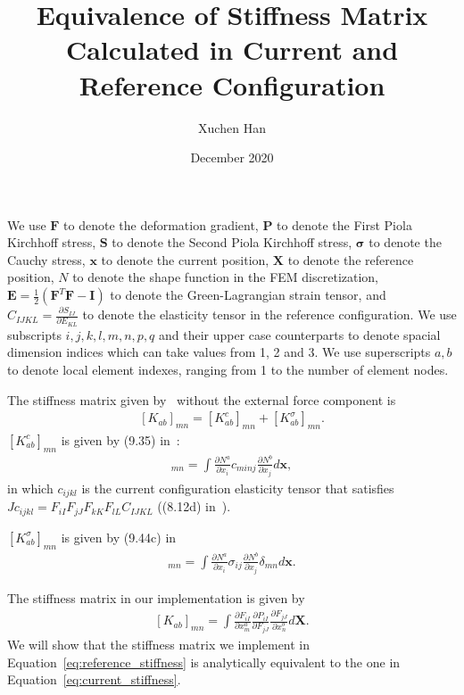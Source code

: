 \documentclass[a4paper]{article}
\title{Equivalence of Stiffness Matrix Calculated in Current and Reference
Configuration}
\author{Xuchen Han}
\date{December 2020}
\newcommand{\mb}[1]{{\mathbf{#1}}}
\newcommand{\EE}{\mb{E}}
\newcommand{\FF}{\mb{F}}
\newcommand{\II}{\mb{I}}
\newcommand{\PP}{\mb{P}}
\renewcommand{\SS}{\mb{S}}
\newcommand{\XX}{\mb{X}}
\newcommand{\xx}{\mb{x}}
\newcommand{\ssigma}{\boldsymbol{\sigma}}
\begin{document}
    \maketitle

    We use $\FF$ to denote the deformation gradient, $\PP$ to denote the
    First Piola
    Kirchhoff stress, $\SS$ to denote the Second Piola Kirchhoff stress,
    $\ssigma$
    to denote the Cauchy stress, $\xx$ to denote the current position, $\XX$
    to denote the reference position, $N$ to denote the shape function in the
    FEM discretization, $\EE = \frac{1}{2}(\FF^T \FF - \II)$ to denote the
    Green-Lagrangian strain tensor, and $C_{IJKL} = \frac{\partial
        S_{IJ}}{\partial E_{KL}}$ to denote the elasticity tensor in the
    reference configuration. We use subscripts $i, j, k, l, m, n, p, q$ and
    their upper case counterparts to denote spacial dimension indices which
    can take values from 1, 2 and 3. We use superscripts $a, b$ to denote
    local element indexes, ranging from 1 to the number of element nodes.

    The stiffness matrix given by~\cite{Bonet} without the external force
    component is
    \begin{align}
        \label{eq:current_stiffness}
        [K_{ab}]_{mn} = [K^c_{ab}]_{mn} + [K^\sigma_{ab}]_{mn}.
    \end{align}
    $[K^c_{ab}]_{mn}$ is given by (9.35) in~\cite{Bonet}:
    \begin{align}
    [K^c_{ab}]
        _{mn} = \int \frac{\partial N^a}{\partial x_i} c_{minj}
        \frac{\partial N^b}{\partial x_j}d\xx,
    \end{align}
    in which $c_{ijkl}$ is the current configuration elasticity tensor that
    satisfies $J c_{ijkl} = F_{iI}F_{jJ}F_{kK}F_{lL}C_{IJKL}$ ((8.12d)
    in~\cite{Bonet}).

    $[K^{\sigma}_{ab}]_{mn}$ is given by (9.44c) in~\cite{Bonet}
    \begin{align}
    [K^\sigma_{ab}]
        _{mn} = \int \frac{\partial N^a}{\partial x_i} \sigma_{ij}
        \frac{\partial N^b}{\partial x_j} \delta_{mn} d\xx.
    \end{align}

    The stiffness matrix in our implementation is given by
    \begin{align}
        \label{eq:reference_stiffness}
        [K_{ab}]_{mn} = \int \frac{\partial F_{iI}}{\partial x^a_m}
        \frac{\partial P_{iI}}{\partial F_{jJ}} \frac{\partial
            F_{jJ}}{\partial x^b_n} d\XX.
    \end{align}
    We will show that the stiffness matrix we implement in
    Equation~\ref{eq:reference_stiffness} is analytically equivalent to the
    one in Equation~\ref{eq:current_stiffness}.
\end{document}
